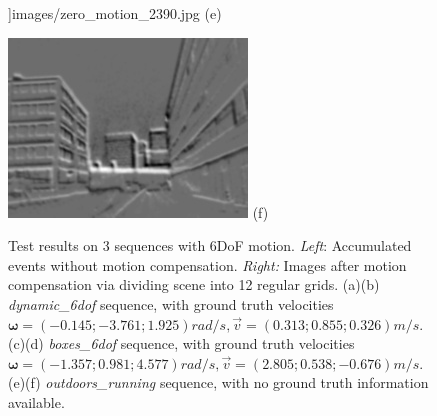 \begin{figure}
\begin{minipage}[t]{0.48\textwidth}
    \textwidth]{images/zero_motion_2390.jpg} (e)
  \end{minipage}
  \hfill
  \begin{minipage}[t]{0.48\textwidth}
    \centering \includegraphics[width =
    \textwidth]{images/optimized_2390.jpg} (f)
  \end{minipage}
  \hfill
  \caption{Test results on 3 sequences with 6DoF
    motion. \textit{Left}: Accumulated events without motion
    compensation. \textit{Right:} Images after motion compensation via
    dividing scene into 12 regular grids. (a)(b)
    \textit{dynamic\_6dof} sequence, with ground truth velocities
    $\bm{\omega}=(-0.145;-3.761;1.925) rad/s,
    \vec{v}=(0.313;0.855;0.326) m/s$. (c)(d) \textit{boxes\_6dof}
    sequence, with ground truth velocities
    $\bm{\omega}=(-1.357;0.981;4.577) rad/s,
    \vec{v}=(2.805;0.538;-0.676) m/s$. (e)(f)
    \textit{outdoors\_running} sequence, with no ground truth
    information available.}
  \label{fig:patches_compr}
\end{figure}


